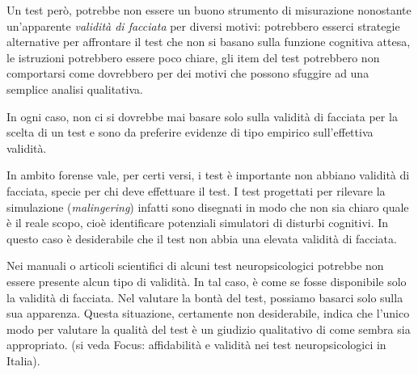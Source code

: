 \documentclass[
  italian,
  letterpaper,
  paper=A4,
  headinclude=on,
  footinclude=on,
  12pt]{scrbook}
\begin{document}
Un test però, potrebbe non essere un buono strumento di misurazione
nonostante un'apparente \emph{validità di facciata} per diversi motivi:
potrebbero esserci strategie alternative per affrontare il test che non
si basano sulla funzione cognitiva attesa, le istruzioni potrebbero
essere poco chiare, gli item del test potrebbero non comportarsi come
dovrebbero per dei motivi che possono sfuggire ad una semplice analisi
qualitativa.

In ogni caso, non ci si dovrebbe mai basare solo sulla validità di
facciata per la scelta di un test e sono da preferire evidenze di tipo
empirico sull'effettiva validità.

\begin{tcolorbox}[enhanced jigsaw, left=2mm, colbacktitle=quarto-callout-tip-color!10!white, bottomrule=.15mm, opacityback=0, coltitle=black, colframe=quarto-callout-tip-color-frame, opacitybacktitle=0.6, leftrule=.75mm, colback=white, toprule=.15mm, title=\textcolor{quarto-callout-tip-color}{\faLightbulb}\hspace{0.5em}{Validità di facciata in ambito forense}, titlerule=0mm, arc=.35mm, breakable, rightrule=.15mm, bottomtitle=1mm, toptitle=1mm]

In ambito forense vale, per certi versi, i test è importante non abbiano
validità di facciata, specie per chi deve effettuare il test. I test
progettati per rilevare la simulazione (\emph{malingering}) infatti sono
disegnati in modo che non sia chiaro quale è il reale scopo, cioè
identificare potenziali simulatori di disturbi cognitivi. In questo caso
è desiderabile che il test non abbia una elevata validità di facciata.

\end{tcolorbox}

{\vspace{1cm}}

\begin{tcolorbox}[enhanced jigsaw, left=2mm, colbacktitle=quarto-callout-tip-color!10!white, bottomrule=.15mm, opacityback=0, coltitle=black, colframe=quarto-callout-tip-color-frame, opacitybacktitle=0.6, leftrule=.75mm, colback=white, toprule=.15mm, title=\textcolor{quarto-callout-tip-color}{\faLightbulb}\hspace{0.5em}{Validità di facciata come unico tipo di validità.}, titlerule=0mm, arc=.35mm, breakable, rightrule=.15mm, bottomtitle=1mm, toptitle=1mm]

Nei manuali o articoli scientifici di alcuni test neuropsicologici
potrebbe non essere presente alcun tipo di validità. In tal caso, è come
se fosse disponibile solo la validità di facciata. Nel valutare la bontà
del test, possiamo basarci solo sulla sua apparenza. Questa situazione,
certamente non desiderabile, indica che l'unico modo per valutare la
qualità del test è un giudizio qualitativo di come sembra sia
appropriato. (si veda Focus: affidabilità e validità nei test
neuropsicologici in Italia).

\end{tcolorbox}
\end{document}
